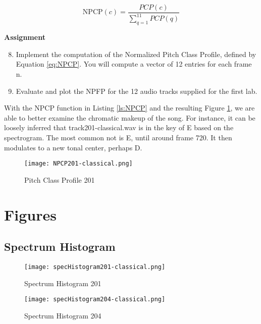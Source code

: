 \documentclass{article} %
\begin{document}
\begin{equation}
\label{eq:NPCP}
\text{NPCP}(c)=\frac{PCP(c)}{\sum\limits_{q=1}^{11}PCP(q)}
\end{equation}


\begin{framed}
\textbf{Assignment}
\begin{enumerate}
\setcounter{enumi}{7}
\item Implement the computation of the Normalized Pitch Class Profile, defined by Equation \ref{eq:NPCP}. You will compute a vector of 12 entries for each frame n.
\item Evaluate and plot the NPFP for the 12 audio tracks supplied for the first lab. 
\end{enumerate}
\end{framed}

With the NPCP function in Listing \ref{ls:NPCP} and the resulting Figure \ref{fig:NPCP201}, we are able to better examine the chromatic makeup of the song. 
For instance, it can be loosely inferred that track201-classical.wav is in the key of E based on the spectrogram. The most common not is E, until around frame 720.
It then modulates to a new tonal center, perhaps D. 
 

\begin{figure}[H]
\centering
\texttt{[image: NPCP201-classical.png]}
\caption{Pitch Class Profile 201}
\label{fig:NPCP201}
\end{figure}

\clearpage
\appendix
\section{Figures}
\subsection{Spectrum Histogram}
\label{sec:specHis}

\begin{figure}[H]
\centering
\texttt{[image: specHistogram201-classical.png]}
\caption{Spectrum Histogram 201}
\label{fig:hist201}
\end{figure}

\begin{figure}[H]
\centering
\texttt{[image: specHistogram204-classical.png]}
\caption{Spectrum Histogram 204}
\label{fig:hist204}
\end{figure}
\end{document}
